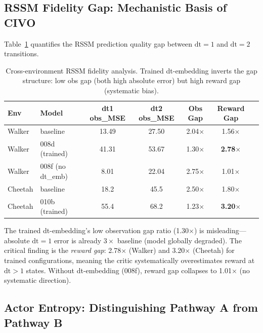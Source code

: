 \documentclass[10pt,letterpaper]{article}
\begin{document}
\subsection{RSSM Fidelity Gap: Mechanistic Basis of CIVO}
\label{sec:rssm_fidelity}

Table~\ref{tab:rssm_fidelity} quantifies the RSSM prediction quality gap between $\mathrm{dt}=1$ and $\mathrm{dt}=2$ transitions.

\begin{table}[h]
\centering
\caption{Cross-environment RSSM fidelity analysis. Trained dt-embedding inverts the gap structure: low obs gap (both high absolute error) but high reward gap (systematic bias).}
\label{tab:rssm_fidelity}
\begin{tabular}{llccccc}
\toprule
Env & Model & dt1 obs\_MSE & dt2 obs\_MSE & Obs Gap & Reward Gap \\
\midrule
Walker & baseline & 13.49 & 27.50 & 2.04$\times$ & 1.56$\times$ \\
Walker & 008d (trained) & 41.31 & 53.67 & 1.30$\times$ & \textbf{2.78$\times$} \\
Walker & 008f (no dt\_emb) & 8.01 & 22.04 & 2.75$\times$ & 1.01$\times$ \\
Cheetah & baseline & 18.2 & 45.5 & 2.50$\times$ & 1.80$\times$ \\
Cheetah & 010b (trained) & 55.4 & 68.2 & 1.23$\times$ & \textbf{3.20$\times$} \\
\bottomrule
\end{tabular}
\end{table}

The trained dt-embedding's low observation gap ratio (1.30$\times$) is misleading---absolute $\mathrm{dt}=1$ error is already $3\times$ baseline (model globally degraded).
The critical finding is the \emph{reward gap}: 2.78$\times$ (Walker) and 3.20$\times$ (Cheetah) for trained configurations, meaning the critic systematically overestimates reward at $\mathrm{dt}>1$ states.
Without dt-embedding (008f), reward gap collapses to 1.01$\times$ (no systematic direction).

\subsection{Actor Entropy: Distinguishing Pathway A from Pathway B}
\label{sec:entropy}
\end{document}
